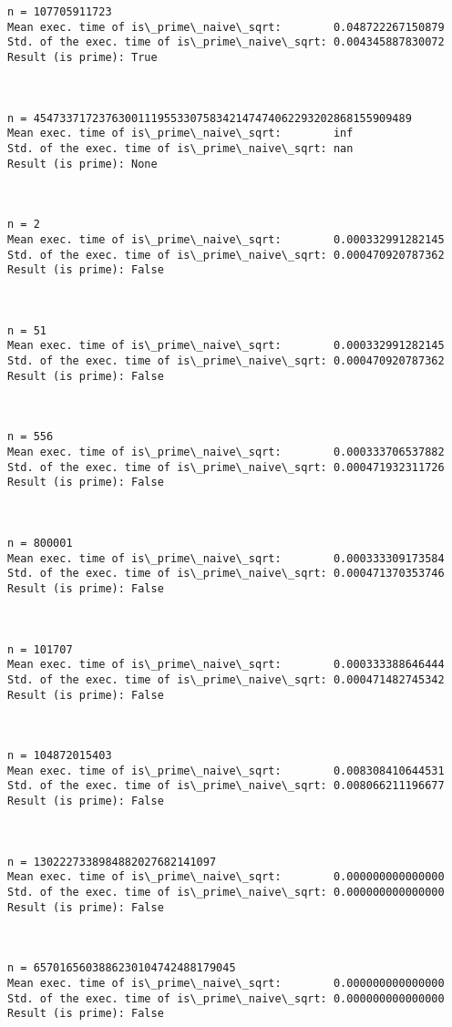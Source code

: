 \documentclass[11pt]{article}
\begin{document}
\begin{Verbatim}[commandchars=\\\{\}]
n = 107705911723
Mean exec. time of is\_prime\_naive\_sqrt:        0.048722267150879
Std. of the exec. time of is\_prime\_naive\_sqrt: 0.004345887830072
Result (is prime): True



n = 4547337172376300111955330758342147474062293202868155909489
Mean exec. time of is\_prime\_naive\_sqrt:        inf
Std. of the exec. time of is\_prime\_naive\_sqrt: nan
Result (is prime): None



n = 2
Mean exec. time of is\_prime\_naive\_sqrt:        0.000332991282145
Std. of the exec. time of is\_prime\_naive\_sqrt: 0.000470920787362
Result (is prime): False



n = 51
Mean exec. time of is\_prime\_naive\_sqrt:        0.000332991282145
Std. of the exec. time of is\_prime\_naive\_sqrt: 0.000470920787362
Result (is prime): False



n = 556
Mean exec. time of is\_prime\_naive\_sqrt:        0.000333706537882
Std. of the exec. time of is\_prime\_naive\_sqrt: 0.000471932311726
Result (is prime): False



n = 800001
Mean exec. time of is\_prime\_naive\_sqrt:        0.000333309173584
Std. of the exec. time of is\_prime\_naive\_sqrt: 0.000471370353746
Result (is prime): False



n = 101707
Mean exec. time of is\_prime\_naive\_sqrt:        0.000333388646444
Std. of the exec. time of is\_prime\_naive\_sqrt: 0.000471482745342
Result (is prime): False



n = 104872015403
Mean exec. time of is\_prime\_naive\_sqrt:        0.008308410644531
Std. of the exec. time of is\_prime\_naive\_sqrt: 0.008066211196677
Result (is prime): False



n = 1302227338984882027682141097
Mean exec. time of is\_prime\_naive\_sqrt:        0.000000000000000
Std. of the exec. time of is\_prime\_naive\_sqrt: 0.000000000000000
Result (is prime): False



n = 6570165603886230104742488179045
Mean exec. time of is\_prime\_naive\_sqrt:        0.000000000000000
Std. of the exec. time of is\_prime\_naive\_sqrt: 0.000000000000000
Result (is prime): False




\end{Verbatim}
\end{document}
